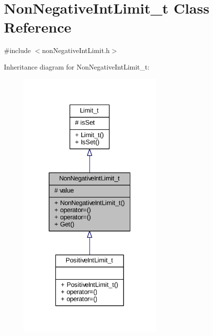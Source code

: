 \hypertarget{class_non_negative_int_limit__t}{}\section{Non\+Negative\+Int\+Limit\+\_\+t Class Reference}
\label{class_non_negative_int_limit__t}


{\ttfamily \#include $<$non\+Negative\+Int\+Limit.\+h$>$}



Inheritance diagram for Non\+Negative\+Int\+Limit\+\_\+t\+:
\nopagebreak
\begin{figure}[H]
\begin{center}
\leavevmode
\includegraphics[width=205pt]{class_non_negative_int_limit__t__inherit__graph}
\end{center}
\end{figure}


